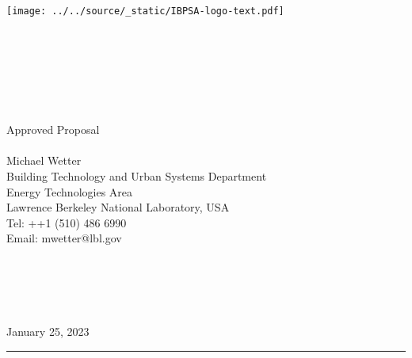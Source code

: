 \begin{titlepage}
\hspace*{12.1cm}\texttt{[image: ../../source/\_static/IBPSA-logo-text.pdf]}~\\
\begin{flushright}
\vspace{-1cm}
\large{~}
\\[5mm]
\hrulefill
\\[5mm]
 \Large\sffamily{~}\\
 \Large{}\\
\Large\sffamily{~}\\[3mm]
\hrulefill
~\\[20mm]
Approved Proposal\\
~\\[20mm]
\large{Michael Wetter\\
Building Technology and Urban Systems Department\\
Energy Technologies Area\\
Lawrence Berkeley National Laboratory, USA\\
Tel: ++1 (510) 486 6990\\
Email: mwetter@lbl.gov\\
~\\
~\\
~\\
~\\
~}\\[20mm]
\large{January 25, 2023}
\\[20mm]
\end{flushright}
\hrule
~\\[2mm]
\end{titlepage}
